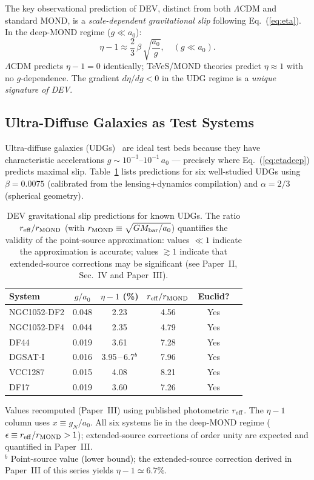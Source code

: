 \documentclass[aps,prd,twocolumn,showpacs,superscriptaddress]{revtex4-2}
\newcommand{\aO}{a_0}
\newcommand{\LCDM}{$\Lambda$CDM}
\begin{document}
The key observational prediction of DEV, distinct from both
\LCDM{} and standard MOND, is a \emph{scale-dependent gravitational slip}
following Eq.~(\ref{eq:eta}).
In the deep-MOND regime ($g \ll \aO$):
\begin{equation}
  \eta - 1 \approx \frac{2}{3}\,\beta\,\sqrt{\frac{\aO}{g}},
  \quad (g \ll \aO).
  \label{eq:etadeep}
\end{equation}
\LCDM{} predicts $\eta - 1 = 0$ identically;
TeVeS/MOND theories predict $\eta \approx 1$ with no $g$-dependence.
The gradient $d\eta/dg < 0$ in the UDG regime is a
\emph{unique signature of DEV}.

\subsection{Ultra-Diffuse Galaxies as Test Systems}

Ultra-diffuse galaxies (UDGs)~\cite{vanDokkum2015} are ideal test beds
because they have characteristic accelerations
$g \sim 10^{-3}$--$10^{-1}\,\aO$ —
precisely where Eq.~(\ref{eq:etadeep}) predicts maximal slip.
Table~\ref{tab:udg} lists predictions for six well-studied UDGs using
$\beta = 0.0075$ (calibrated from the lensing+dynamics compilation)
and $\alpha = 2/3$ (spherical geometry).

\begin{table}[h]
\caption{DEV gravitational slip predictions for known UDGs.
The ratio $r_{\rm eff}/r_{\rm MOND}$ (with
$r_{\rm MOND}\equiv\sqrt{GM_{\rm bar}/\aO}$) quantifies the validity
of the point-source approximation: values $\ll 1$ indicate the
approximation is accurate; values $\gtrsim 1$ indicate that
extended-source corrections may be significant (see Paper~II,
Sec.~IV and Paper~III).}
\label{tab:udg}
\begin{ruledtabular}
\begin{tabular}{lccccc}
System & $g/\aO$ & $\eta-1$ (\%) & $r_{\rm eff}/r_{\rm MOND}$ & Euclid? \\
\hline
NGC1052-DF2 & 0.048 & 2.23 & 4.56 & Yes \\
NGC1052-DF4 & 0.044 & 2.35 & 4.79 & Yes \\
DF44        & 0.019 & 3.61 & 7.28 & Yes \\
DGSAT-I     & 0.016 & 3.95\,--\,6.7$^{b}$ & 7.96 & Yes \\
VCC1287     & 0.015 & 4.08 & 8.21 & Yes \\
DF17        & 0.019 & 3.60 & 7.26 & Yes \\
\end{tabular}
\end{ruledtabular}
{\small Values recomputed (Paper~III) using published
photometric $r_{\rm eff}$. The $\eta-1$ column uses
$x \equiv g_N/\aO$. All six systems lie in the deep-MOND
regime ($\epsilon \equiv r_{\rm eff}/r_{\rm MOND}>1$);
extended-source corrections of order unity are expected and
quantified in Paper~III.\\
$^{b}$ Point-source value (lower bound); the extended-source
correction derived in Paper~III of this series yields
$\eta-1 \simeq 6.7\%$.}
\end{table}
\end{document}
